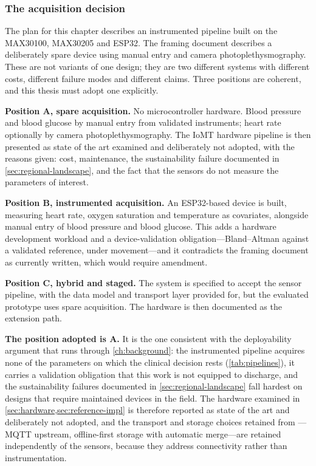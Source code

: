 \documentclass[12pt,a4paper,oneside]{report}
\begin{document}
\subsubsection{The acquisition decision}\label{sec:acq-decision}

The plan for this chapter describes an instrumented pipeline built on the MAX30100, MAX30205 and ESP32. The framing document describes a deliberately spare device using manual entry and camera photoplethysmography. These are not variants of one design; they are two different systems with different costs, different failure modes and different claims. Three positions are coherent, and this thesis must adopt one explicitly.

\textbf{Position A, spare acquisition.} No microcontroller hardware. Blood pressure and blood glucose by manual entry from validated instruments; heart rate optionally by camera photoplethysmography. The IoMT hardware pipeline is then presented as state of the art examined and deliberately not adopted, with the reasons given: cost, maintenance, the sustainability failure documented in \cref{sec:regional-landscape}, and the fact that the sensors do not measure the parameters of interest.

\textbf{Position B, instrumented acquisition.} An ESP32-based device is built, measuring heart rate, oxygen saturation and temperature as covariates, alongside manual entry of blood pressure and blood glucose. This adds a hardware development workload and a device-validation obligation---Bland--Altman against a validated reference, under movement---and it contradicts the framing document as currently written, which would require amendment.

\textbf{Position C, hybrid and staged.} The system is specified to accept the sensor pipeline, with the data model and transport layer provided for, but the evaluated prototype uses spare acquisition. The hardware is then documented as the extension path.

\textbf{The position adopted is A.} It is the one consistent with the deployability argument that runs through \cref{ch:background}: the instrumented pipeline acquires none of the parameters on which the clinical decision rests (\cref{tab:pipelines}), it carries a validation obligation that this work is not equipped to discharge, and the sustainability failures documented in \cref{sec:regional-landscape} fall hardest on designs that require maintained devices in the field. The hardware examined in \cref{sec:hardware,sec:reference-impl} is therefore reported as state of the art and deliberately not adopted, and the transport and storage choices retained from \textcite{efendi2025}---MQTT upstream, offline-first storage with automatic merge---are retained independently of the sensors, because they address connectivity rather than instrumentation.
\end{document}
